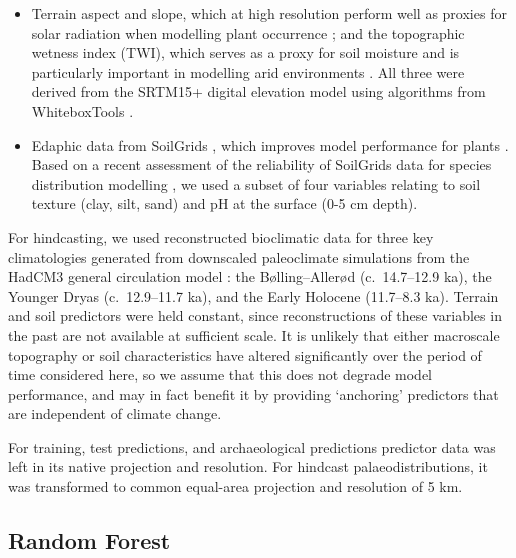 \documentclass[
  authoryear,
  preprint]{elsarticle}
\providecommand{\tightlist}{%
  \setlength{\itemsep}{0pt}\setlength{\parskip}{0pt}}\usepackage{longtable,booktabs,array}
\begin{document}
\begin{itemize}
\tightlist
\item
  Terrain aspect and slope, which at high resolution perform well as
  proxies for solar radiation when modelling plant occurrence
  \citep{AustinVanNiel2011, LeempoelEtAl2015}; and the topographic
  wetness index (TWI), which serves as a proxy for soil moisture and is
  particularly important in modelling arid environments
  \citep{KopeckyCizkova2010, CamposEtAl2016, DiVirgilioEtAl2018}. All
  three were derived from the SRTM15+ digital elevation model using
  algorithms from WhiteboxTools \citep{Lindsay2016}.
\end{itemize}

\begin{itemize}
\tightlist
\item
  Edaphic data from SoilGrids \citep{HenglEtAl2014, HenglEtAl2017},
  which improves model performance for plants
  \citep{DubuisEtAl2013, ModEtAl2016, VelazcoEtAl2017}. Based on a
  recent assessment of the reliability of SoilGrids data for species
  distribution modelling \citep{MillerEtAl2024}, we used a subset of
  four variables relating to soil texture (clay, silt, sand) and pH at
  the surface (0-5 cm depth).
\end{itemize}

For hindcasting, we used reconstructed bioclimatic data for three key
climatologies generated from downscaled paleoclimate simulations from
the HadCM3 general circulation model
\citep{FordhamEtAl2017, BrownEtAl2018}: the Bølling--Allerød
(c.~14.7--12.9 ka), the Younger Dryas (c.~12.9--11.7 ka), and the Early
Holocene (11.7--8.3 ka). Terrain and soil predictors were held constant,
since reconstructions of these variables in the past are not available
at sufficient scale. It is unlikely that either macroscale topography or
soil characteristics have altered significantly over the period of time
considered here, so we assume that this does not degrade model
performance, and may in fact benefit it by providing `anchoring'
predictors that are independent of climate change.

For training, test predictions, and archaeological predictions predictor
data was left in its native projection and resolution. For hindcast
palaeodistributions, it was transformed to common equal-area projection
and resolution of 5 km.

\subsection{Random Forest}\label{random-forest}
\end{document}
